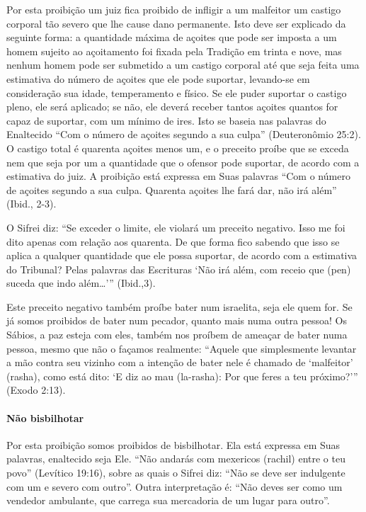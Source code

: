 Por esta proibição um juiz fica proibido de infligir a um malfeitor um
castigo corporal tão severo que lhe cause dano permanente. Isto deve ser
explicado da seguinte forma: a quantidade máxima de açoites que pode ser
imposta a um homem sujeito ao açoitamento foi fixada pela Tradição em
trinta e nove, mas nenhum homem pode ser submetido a um castigo corporal
até que seja feita uma estimativa do número de açoites que ele pode
suportar, levando-se em consideração sua idade, temperamento e físico.
Se ele puder suportar o castigo pleno, ele será aplicado; se não, ele
deverá receber tantos açoites quantos for capaz de suportar, com um mínimo de
ires. Isto se baseia nas palavras do Enaltecido ``Com o número de açoites segundo a
sua culpa'' (Deuteronômio 25:2). O castigo total é quarenta açoites
menos um, e o preceito proíbe que se exceda nem que seja por um a
quantidade que o ofensor pode suportar, de acordo com a estimativa do
juiz. A proibição está expressa em Suas palavras ``Com o número de
açoites segundo a sua culpa. Quarenta açoites lhe fará dar, não irá
além'' (Ibid., 2-3).

O Sifrei diz: ``Se exceder o limite, ele violará um preceito negativo.
Isso me foi dito apenas com relação aos quarenta. De que forma fico
sabendo que isso se aplica a qualquer quantidade que ele possa suportar,
de acordo com a estimativa do Tribunal? Pelas palavras das Escrituras
`Não irá além, com receio que (pen) suceda que indo além\ldots{}'''
(Ibid.,3).

Este preceito negativo também proíbe bater num israelita, seja ele quem
for. Se já somos proibidos de bater num pecador, quanto mais numa outra
pessoa! Os Sábios, a paz esteja com eles, também nos proíbem de ameaçar
de bater numa pessoa, mesmo que não o façamos realmente: ``Aquele que
simplesmente levantar a mão contra seu vizinho com a intenção de bater
nele é chamado de `malfeitor' (rasha), como está dito: `E diz ao mau
(la-rasha): Por que feres a teu próximo?''' (Exodo 2:13).

\paragraph{Não bisbilhotar}

Por esta proibição somos proibidos de bisbilhotar. Ela está expressa em
Suas palavras, enaltecido seja Ele. ``Não andarás com mexericos (rachil)
entre o teu povo'' (Levítico 19:16), sobre as quais o Sifrei diz: ``Não
se deve ser indulgente com um e severo com outro''. Outra interpretação
é: ``Não deves ser como um vendedor ambulante, que carrega sua
mercadoria de um lugar para outro''.

